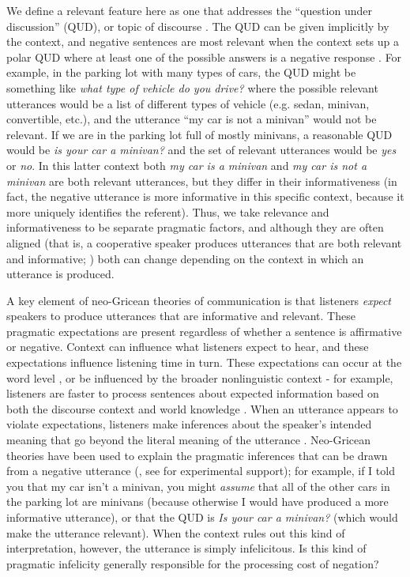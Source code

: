\documentclass[man, floatsintext, noapacite]{apa6}
\begin{document}
We define a relevant feature here as one that addresses the ``question under discussion'' (QUD), or topic of discourse \cite{roberts2012, vanrooy2003}. The QUD can be given implicitly by the context, and negative sentences are most relevant when the context sets up a polar QUD where at least one of the possible answers is a negative response \cite{xiang2020}. For example, in the parking lot with many types of cars, the QUD might be something like \textit{what type of vehicle do you drive?} where the possible relevant utterances would be a list of different types of vehicle (e.g. sedan, minivan, convertible, etc.), and the utterance ``my car is not a minivan'' would not be relevant. If we are in the parking lot full of mostly minivans, a reasonable QUD would be \textit{is your car a minivan?} and the set of relevant utterances would be \textit{yes} or \textit{no}. In this latter context both \textit{my car is a minivan} and \textit{my car is not a minivan} are both relevant utterances, but they differ in their informativeness (in fact, the negative utterance is more informative in this specific context, because it more uniquely identifies the referent). Thus, we take relevance and informativeness to be separate pragmatic factors, and although they are often aligned (that is, a cooperative speaker produces utterances that are both relevant and informative; ) both can change depending on the context in which an utterance is produced.

A key element of neo-Gricean theories of communication is that listeners \textit{expect} speakers to produce utterances that are informative and relevant. These pragmatic expectations are present regardless of whether a sentence is affirmative or negative. Context can influence what listeners expect to hear, and these expectations influence listening time in turn. These expectations can occur at the word level \cite{hale2001, levy2008}, or be influenced by the broader nonlinguistic context - for example, listeners are faster to process sentences about expected information based on both the discourse context and world knowledge \cite{hald2007, lemke2021}. When an utterance appears to violate expectations, listeners make inferences about the speaker's intended meaning that go beyond the literal meaning of the utterance \cite{kravtchenko2022}. Neo-Gricean theories have been used to explain the pragmatic inferences that can be drawn from a negative utterance (, see  for experimental support); for example, if I told you that my car isn't a minivan, you might \textit{assume} that all of the other cars in the parking lot are minivans (because otherwise I would have produced a more informative utterance), or that the QUD is \textit{Is your car a minivan?} (which would make the utterance relevant).  When the context rules out this kind of interpretation, however, the utterance is simply infelicitous. Is this kind of pragmatic infelicity generally responsible for the processing cost of negation?
\end{document}
